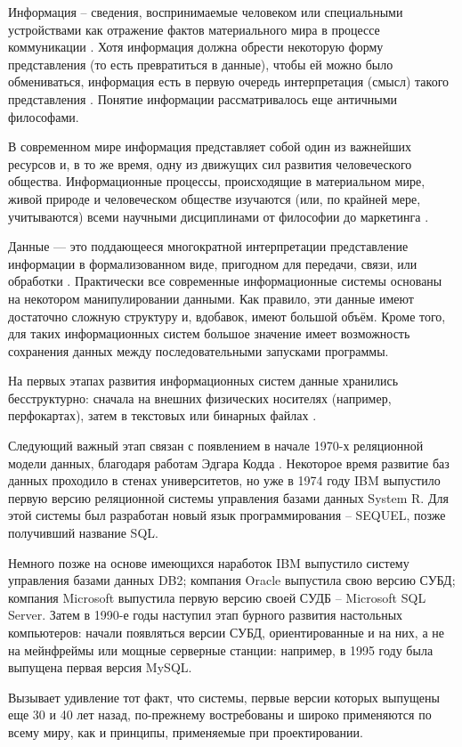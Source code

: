 \label{sec:introduction}

Информация -- сведения, воспринимаемые человеком или специальными устройствами как отражение фактов материального мира в процессе коммуникации \cite{gost_7.0}. Хотя информация должна обрести некоторую форму представления (то есть превратиться в данные), чтобы ей можно было обмениваться, информация есть в первую очередь интерпретация (смысл) такого представления \cite{iso_iec_vocabulary}. Понятие информации рассматривалось еще античными философами.

В современном мире информация представляет собой один из важнейших ресурсов и, в то же время, одну из движущих сил развития человеческого общества. Информационные процессы, происходящие в материальном мире, живой природе и человеческом обществе изучаются (или, по крайней мере, учитываются) всеми научными дисциплинами от философии до маркетинга \cite{wiki_information}.

Данные — это поддающееся многократной интерпретации представление информации в формализованном виде, пригодном для передачи, связи, или обработки \cite{iso_iec_it_vocabulary}. Практически все современные информационные системы основаны на некотором манипулировании данными. Как правило, эти данные имеют достаточно сложную структуру и, вдобавок, имеют большой объём. Кроме того, для таких информационных систем большое значение имеет возможность сохранения данных между последовательными запусками программы.

На первых этапах развития информационных систем данные хранились бесструктурно: сначала на внешних физических носителях (например, перфокартах), затем в текстовых или бинарных файлах \cite{habr_db_tutorial}. 

Следующий важный этап связан с появлением в начале 1970-х реляционной модели данных, благодаря работам Эдгара Кодда \cite{wiki_db}. Некоторое время развитие баз данных проходило в стенах университетов, но уже в 1974 году IBM выпустило первую версию реляционной системы управления базами данных System R. Для этой системы был разработан новый язык программирования -- SEQUEL, позже получивший название SQL. 

Немного позже на основе имеющихся наработок IBM выпустило систему управления базами данных DB2; компания Oracle выпустила свою версию СУБД; компания Microsoft выпустила первую версию своей СУДБ -- Microsoft SQL Server. Затем в 1990-е годы наступил этап бурного развития настольных компьютеров: начали появляться версии СУБД, ориентированные и на них, а не на мейнфреймы или мощные серверные станции: например, в 1995 году была выпущена первая версия MySQL.

Вызывает удивление тот факт, что системы, первые версии которых выпущены еще 30 и 40 лет назад, по-прежнему востребованы и широко применяются по всему миру, как и принципы, применяемые при проектировании.
